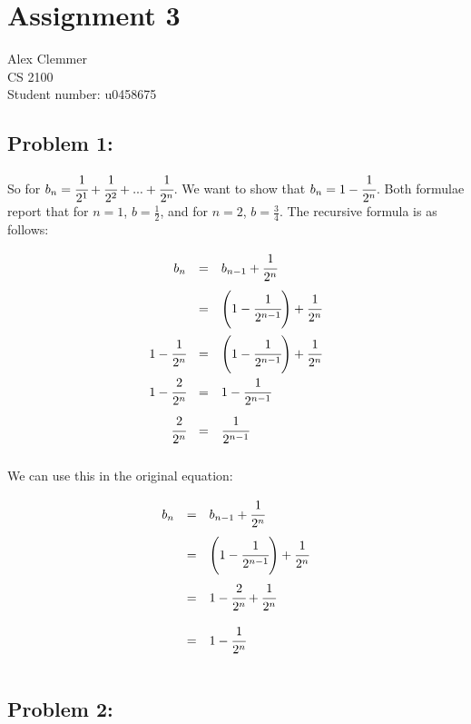 \documentclass[a4paper]{article}
\begin{document}
\section*{Assignment 3}
Alex Clemmer\\
CS 2100 \\
Student number: u0458675

\subsection*{Problem 1:} 

So for $b_n = \cfrac{1}{2^1} + \cfrac{1}{2^2} + ... + \cfrac{1}{2^n}$. We want to show that $b_n = 1 - \cfrac{1}{2^n}$. Both formulae report that for $n=1$, $b = \frac{1}{2}$, and for $n = 2$, $b = \frac{3}{4}$. The recursive formula is as follows:

\begin{equation}
\begin{array}{rll}
b_n & = & b_{n-1} + \cfrac{1}{2^n} \\[.15in]
& = & \left( 1-\cfrac{1}{2^{n-1}} \right) + \cfrac{1}{2^n} \\[.2in]
1- \cfrac{1}{2^n} & = & \left( 1-\cfrac{1}{2^{n-1}} \right) + \cfrac{1}{2^n} \\[.15in]
1- \cfrac{2}{2^n} & = & 1-\cfrac{1}{2^{n-1}} \\[.15in]
\cfrac{2}{2^n} & = & \cfrac{1}{2^{n-1}} \\[.15in]
\end{array}
\end{equation}	

We can use this in the original equation:

\begin{equation}
\begin{array}{rll}
b_n & = & b_{n-1} + \cfrac{1}{2^n} \\[.15in]
& = & \left( 1- \cfrac{1}{2^{n-1}} \right) + \cfrac{1}{2^n} \\[.2in]
& = & 1- \cfrac{2}{2^n} + \cfrac{1}{2^n} \\[.2in]
& = & 1- \cfrac{1}{2^n} \\[.2in]
\end{array}
\end{equation}	

\subsection*{Problem 2:}
\end{document}
